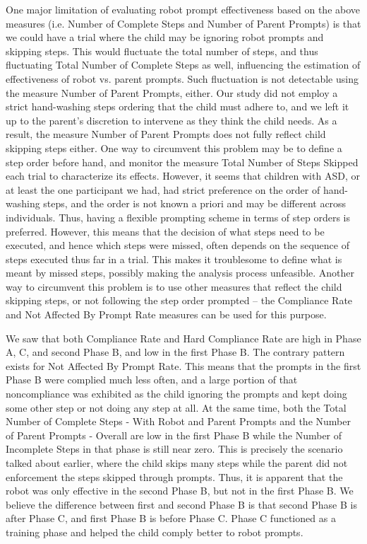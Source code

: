 \documentclass{ut-thesis}
\begin{document}
One major limitation of evaluating robot prompt effectiveness based on the above measures (i.e. Number of Complete Steps and Number of Parent Prompts) is that we could have a trial where the child may be ignoring robot prompts and skipping steps.  This would fluctuate the total number of steps, and thus fluctuating Total Number of Complete Steps as well, influencing the estimation of effectiveness of robot vs. parent prompts.  Such fluctuation is not detectable using the measure Number of Parent Prompts, either.  Our study did not employ a strict hand-washing steps ordering that the child must adhere to, and we left it up to the parent's discretion to intervene as they think the child needs.  As a result, the measure Number of Parent Prompts does not fully reflect child skipping steps either.  One way to circumvent this problem may be to define a step order before hand, and monitor the measure Total Number of Steps Skipped each trial to characterize its effects.  However, it seems that children with ASD, or at least the one participant we had, had strict preference on the order of hand-washing steps, and the order is not known a priori and may be different across individuals.  Thus, having a flexible prompting scheme in terms of step orders is preferred.  However, this means that the decision of what steps need to be executed, and hence which steps were missed, often depends on the sequence of steps executed thus far in a trial.  This makes it troublesome to define what is meant by missed steps, possibly making the analysis process unfeasible.  Another way to circumvent this problem is to use other measures that reflect the child skipping steps, or not following the step order prompted -- the Compliance Rate and Not Affected By Prompt Rate measures can be used for this purpose.

We saw that both Compliance Rate and Hard Compliance Rate are high in Phase A, C, and second Phase B, and low in the first Phase B.  The contrary pattern exists for Not Affected By Prompt Rate.  This means that the prompts in the first Phase B were complied much less often, and a large portion of that noncompliance was exhibited as the child ignoring the prompts and kept doing some other step or not doing any step at all.  At the same time, both the Total Number of Complete Steps - With Robot and Parent Prompts and the Number of Parent Prompts - Overall are low in the first Phase B while the Number of Incomplete Steps in that phase is still near zero.  This is precisely the scenario talked about earlier, where the child skips many steps while the parent did not enforcement the steps skipped through prompts.  Thus, it is apparent that the robot was only effective in the second Phase B, but not in the first Phase B.  We believe the difference between first and second Phase B is that second Phase B is after Phase C, and first Phase B is before Phase C.  Phase C functioned as a training phase and helped the child comply better to robot prompts.
\end{document}
